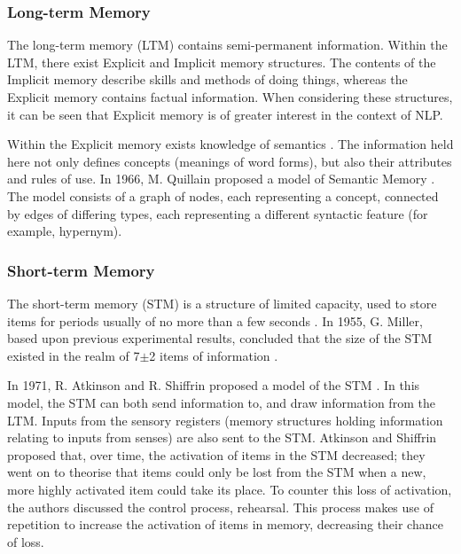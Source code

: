 \documentclass[]{article}
\begin{document}
\subsubsection{Long-term Memory}
\label{LongTerm}
The long-term memory (LTM) contains semi-permanent information. Within the LTM, there exist Explicit and Implicit memory structures. The contents of the Implicit memory describe skills and methods of doing things, whereas the Explicit memory contains factual information\cite{MemoryBaddeleyEysenkAnderson}. When considering these structures, it can be seen that Explicit memory is of greater interest in the context of NLP.

Within the Explicit memory exists knowledge of semantics \cite{MemoryBaddeleyEysenkAnderson}. The information held here not only defines concepts (meanings of word forms), but also their attributes and rules of use. In 1966, M. Quillain proposed a model of Semantic Memory \cite{SemanticMemoryQuillain}. The model consists of a graph of nodes, each representing a concept, connected by edges of differing types, each representing a different syntactic feature (for example, hypernym).  


\subsubsection{Short-term Memory}
\label{ShortTerm}
The short-term memory (STM) is a structure of limited capacity, used to store items for periods usually of no more than a few seconds \cite{MemoryBaddeleyEysenkAnderson}. In 1955, G. Miller, based upon previous experimental results, concluded that the size of the STM existed in the realm of 7$\pm$2 items of information \cite{SevenPlusMinusTwo}. 

In 1971, R. Atkinson and R. Shiffrin proposed a model of the STM \cite{ControlProcessesSTMAtkinson}. In this model, the STM can both send information to, and draw information from the LTM. Inputs from the sensory registers (memory structures holding information relating to inputs from senses) are also sent to the STM. Atkinson and Shiffrin proposed that, over time, the activation of items in the STM decreased; they went on to theorise that items could only be lost from the STM when a new, more highly activated item could take its place. To counter this loss of activation, the authors discussed the control process, rehearsal. This process makes use of repetition to increase the activation of items in memory, decreasing their chance of loss. 
\end{document}
